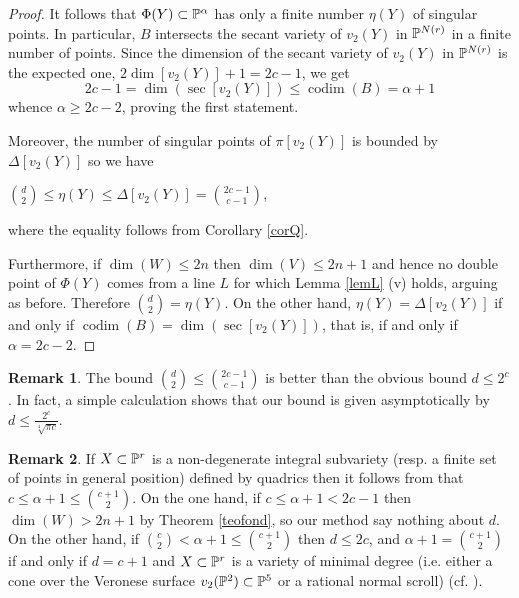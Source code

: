 \documentclass{amsart}
\theoremstyle{definition}
\newtheorem{remark}{Remark}
\begin{document}
\begin{proof}
It follows that $\Phi(Y)\subset\Bbb P^{\alpha}$ has only a finite
number $\eta(Y)$ of singular points. In particular, $B$ intersects the
secant variety of $v_2(Y)$ in $\Bbb P^{N(r)}$ in a
finite number of points. Since the dimension of the secant variety
of $v_2(Y)$ in $\Bbb P^{N(r)}$ is the expected one,
$2\dim[v_2(Y)]+1=2c-1$, we get
$$2c-1=\dim(\sec[v_2(Y)])\leq{\operatorname{codim}}(B)=\alpha+1$$
whence $\alpha\geq 2c-2$, proving the first statement.

Moreover, the number of singular points of $\pi [v_{2}(Y)]$ is
bounded by $\Delta [v_{2}(Y)]$ so we have
\begin{center}
$\binom{d}{2}\leq\eta(Y)\leq\Delta [v_{2}(Y)]=\binom{2c-1}{c-1}$,
\end{center}
where the equality follows from Corollary \ref{corQ}.

Furthermore, if $\dim(W)\leq 2n$ then $\dim(V)\leq 2n+1$ and hence no
double point of $\Phi(Y)$ comes from a line $L$ for which Lemma
\ref{lemL} (v) holds, arguing as before. Therefore
$\binom{d}{2}=\eta(Y)$. On the other hand, $\eta(Y)=\Delta
[v_{2}(Y)]$ if and only if ${\operatorname{codim}}(B)=\dim(\sec[v_2(Y)])$, that is, if
and only if $\alpha=2c-2$.
\end{proof}

\begin{remark}
The bound $\binom{d}{2}\leq \binom{2c-1}{c-1}$ is better than the
obvious bound $d\leq 2^c$. In fact, a simple calculation shows that
our bound is given asymptotically by $d\leq
\frac{2^c}{\sqrt[4]{\pi{c}}}$.
\end{remark}

\begin{remark}\label{rem:zak}
If $X\subset\Bbb P^r$ is a non-degenerate integral subvariety (resp.
a finite set of points in general position) defined by quadrics then
it follows from \cite[Corollary 5.4]{z} that $c\leq \alpha+1
\leq\binom{c+1}{2}$. On the one hand, if $c\leq\alpha+1 < 2c-1$ then
$\dim(W)>2n+1$ by Theorem \ref{teofond}, so our method say nothing
about $d$. On the other hand, if $\binom{c}{2} < \alpha+1
\leq\binom{c+1}{2}$ then $d\leq 2c$, and $\alpha+1=\binom{c+1}{2}$
if and only if $d=c+1$ and $X\subset\Bbb P^r$ is a variety of
minimal degree (i.e. either a cone over the Veronese surface
$v_2(\Bbb P^2)\subset\Bbb P^5$ or a rational normal scroll) (cf.
\cite[Proposition 5.6, Corollary 5.8 and Remark 5.9]{z}).
\end{remark}
\end{document}
